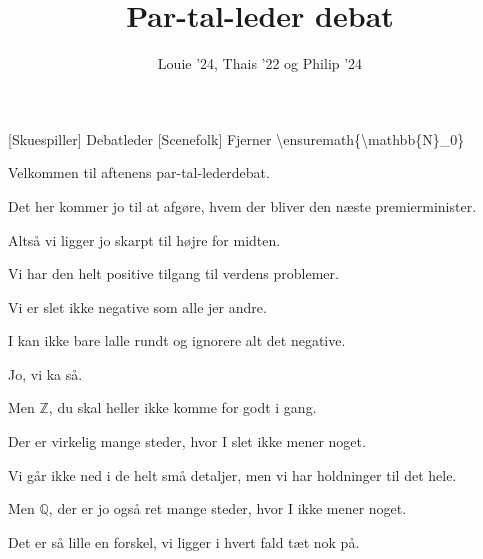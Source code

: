 \documentclass[a4paper,11pt]{article}
\title{Par-tal-leder debat}
\author{Louie '24, Thais '22 og Philip '24}
\begin{document}
\maketitle

\begin{roles}
[Skuespiller] Debatleder
[Scenefolk] Fjerner \textbackslash{}ensuremath\{\textbackslash{}mathbb\{N\}\_0\}
\end{roles}

\begin{sketch}

 Velkommen til aftenens par-tal-lederdebat.


 Det her kommer jo til at afgøre, hvem der bliver den næste premierminister.


 Altså vi ligger jo skarpt til højre for midten.

 Vi har den helt positive tilgang til verdens problemer.

 Vi er slet ikke negative som alle jer andre.

 I kan ikke bare lalle rundt og ignorere alt det negative.

 Jo, vi ka så.

 Men \ensuremath{\mathbb{Z}}, du skal heller ikke komme for godt i gang.

 Der er virkelig mange steder, hvor I slet ikke mener noget.

 Vi går ikke ned i de helt små detaljer, men vi har holdninger til det hele.

 Men \ensuremath{\mathbb{Q}}, der er jo også ret mange steder, hvor I ikke mener noget.

 Det er så lille en forskel, vi ligger i hvert fald tæt nok på.


\end{sketch}
\end{document}
